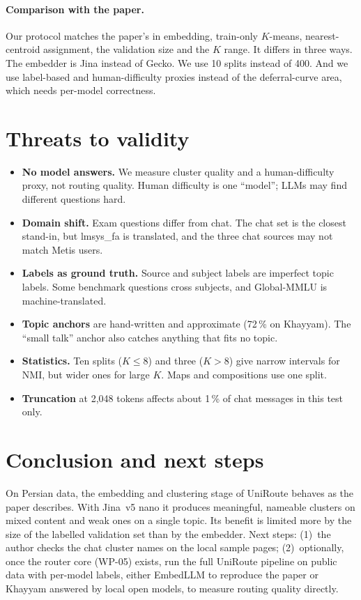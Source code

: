 \documentclass[11pt,a4paper]{article}
\begin{document}
\paragraph{Comparison with the paper.} Our protocol matches the paper's in embedding, train-only $K$-means,
nearest-centroid assignment, the validation size and the $K$ range. It differs in three ways. The embedder is
Jina instead of Gecko. We use 10 splits instead of 400. And we use label-based and human-difficulty proxies
instead of the deferral-curve area, which needs per-model correctness.

\section{Threats to validity}
\begin{itemize}
\item \textbf{No model answers.} We measure cluster quality and a human-difficulty proxy, not routing quality.
Human difficulty is one ``model''; LLMs may find different questions hard.
\item \textbf{Domain shift.} Exam questions differ from chat. The chat set is the closest stand-in, but lmsys\_fa
is translated, and the three chat sources may not match Metis users.
\item \textbf{Labels as ground truth.} Source and subject labels are imperfect topic labels. Some benchmark
questions cross subjects, and Global-MMLU is machine-translated.
\item \textbf{Topic anchors} are hand-written and approximate (72\,\% on Khayyam). The ``small talk'' anchor also
catches anything that fits no topic.
\item \textbf{Statistics.} Ten splits ($K\le8$) and three ($K>8$) give narrow intervals for NMI, but wider ones
for large $K$. Maps and compositions use one split.
\item \textbf{Truncation} at 2{,}048 tokens affects about 1\,\% of chat messages in this test only.
\end{itemize}

\section{Conclusion and next steps}
On Persian data, the embedding and clustering stage of UniRoute behaves as the paper describes. With Jina~v5 nano
it produces meaningful, nameable clusters on mixed content and weak ones on a single topic. Its benefit is limited
more by the size of the labelled validation set than by the embedder. Next steps: (1)~the author checks the chat
cluster names on the local sample pages; (2)~optionally, once the router core
(WP-05) exists, run the full UniRoute pipeline on public data with per-model labels, either EmbedLLM to reproduce
the paper or Khayyam answered by local open models, to measure routing quality directly.
\end{document}

